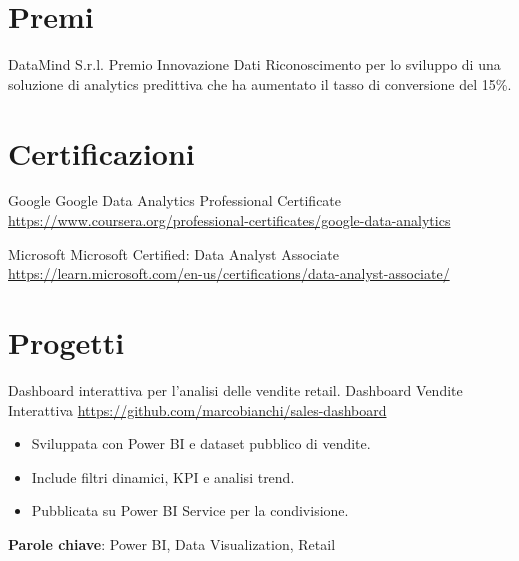 \documentclass[a4paper, serif, 10pt]{moderncv}
\begin{document}
\section{Premi}

        {DataMind S.r.l.}
        {Premio Innovazione Dati}
        {}
        {}
        {Riconoscimento per lo sviluppo di una soluzione di analytics predittiva che ha aumentato il tasso di conversione del 15\%.}
\section{Certificazioni}

        {Google}
        {Google Data Analytics Professional Certificate}
        {\url{https://www.coursera.org/professional-certificates/google-data-analytics}}
        {}
        {}

        {Microsoft}
        {Microsoft Certified: Data Analyst Associate}
        {\url{https://learn.microsoft.com/en-us/certifications/data-analyst-associate/}}
        {}
        {}
\section{Progetti}

        {Dashboard interattiva per l'analisi delle vendite retail.}
        {Dashboard Vendite Interattiva}
        {\url{https://github.com/marcobianchi/sales-dashboard}}
        {}
        {\begin{itemize}
\item Sviluppata con Power BI e dataset pubblico di vendite.
\item Include filtri dinamici, KPI e analisi trend.
\item Pubblicata su Power BI Service per la condivisione.
\end{itemize}
\textbf{Parole chiave}: Power BI, Data Visualization, Retail}
\end{document}
